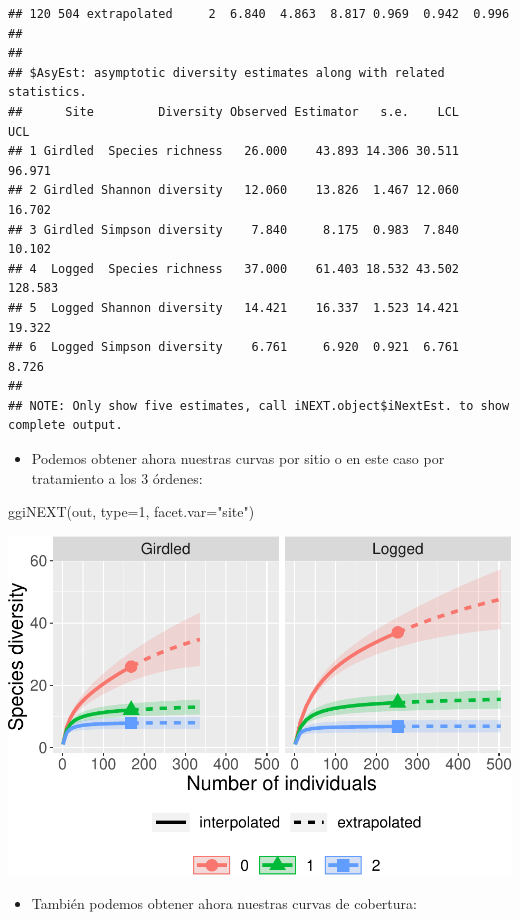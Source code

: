 \documentclass[
]{article}
\newenvironment{Shaded}{\begin{snugshade}}{\end{snugshade}}
\newcommand{\AttributeTok}[1]{\textcolor[rgb]{0.77,0.63,0.00}{#1}}
\newcommand{\DecValTok}[1]{\textcolor[rgb]{0.00,0.00,0.81}{#1}}
\newcommand{\FunctionTok}[1]{\textcolor[rgb]{0.00,0.00,0.00}{#1}}
\newcommand{\NormalTok}[1]{#1}
\newcommand{\StringTok}[1]{\textcolor[rgb]{0.31,0.60,0.02}{#1}}
\providecommand{\tightlist}{%
  \setlength{\itemsep}{0pt}\setlength{\parskip}{0pt}}
\begin{document}
\begin{verbatim}
## 120 504 extrapolated     2  6.840  4.863  8.817 0.969  0.942  0.996
## 
## 
## $AsyEst: asymptotic diversity estimates along with related statistics.
##      Site         Diversity Observed Estimator   s.e.    LCL     UCL
## 1 Girdled  Species richness   26.000    43.893 14.306 30.511  96.971
## 2 Girdled Shannon diversity   12.060    13.826  1.467 12.060  16.702
## 3 Girdled Simpson diversity    7.840     8.175  0.983  7.840  10.102
## 4  Logged  Species richness   37.000    61.403 18.532 43.502 128.583
## 5  Logged Shannon diversity   14.421    16.337  1.523 14.421  19.322
## 6  Logged Simpson diversity    6.761     6.920  0.921  6.761   8.726
## 
## NOTE: Only show five estimates, call iNEXT.object$iNextEst. to show complete output.
\end{verbatim}

\begin{itemize}
\tightlist
\item
  Podemos obtener ahora nuestras curvas por sitio o en este caso por
  tratamiento a los 3 órdenes:
\end{itemize}

\begin{Shaded}
\begin{Highlighting}[]
\FunctionTok{ggiNEXT}\NormalTok{(out, }\AttributeTok{type=}\DecValTok{1}\NormalTok{, }\AttributeTok{facet.var=}\StringTok{"site"}\NormalTok{)}
\end{Highlighting}
\end{Shaded}

\includegraphics{Clase1-bioest_files/figure-latex/unnamed-chunk-35-1.pdf}

\newpage

\begin{itemize}
\tightlist
\item
  También podemos obtener ahora nuestras curvas de cobertura:
\end{itemize}
\end{document}
